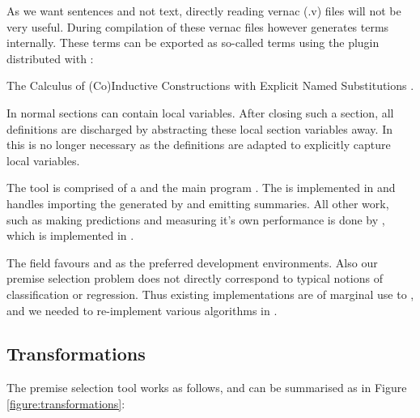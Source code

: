 As we want \pcic sentences and not \gallina text, directly reading \coq vernac (.v) files will not be very useful.
During compilation of these vernac files \coq however generates \pcic terms internally.
These \pcic terms can be exported as so-called \acic terms using the \xml plugin distributed with \coq:
\begin{definition}[\acic]
	The Calculus of (Co)Inductive Constructions with Explicit Named Substitutions \cite{coen2000progettazione}.

	In normal \cic sections can contain local variables.
	After closing such a section, all definitions are discharged by abstracting these local section variables away.
	In \acic this is no longer necessary as the definitions are adapted to explicitly capture local variables.
\end{definition}

The tool is comprised of a \preloader and the main program \roerei.
The \preloader is implemented in \ocaml and handles importing the \xml generated by \coq and emitting summaries.
All other work, such as making predictions and measuring it's own performance is done by \roerei, which is implemented in \cpp.

The \machinelearning field favours \python and \matlab as the preferred development environments.
Also our premise selection problem does not directly correspond to typical notions of classification or regression.
Thus existing implementations are of marginal use to \roerei, and we needed to re-implement various \machinelearning algorithms in \cpp.

\subsection{Transformations}
\label{section:transformations}
The premise selection tool works as follows, and can be summarised as in Figure \ref{figure:transformations}:

